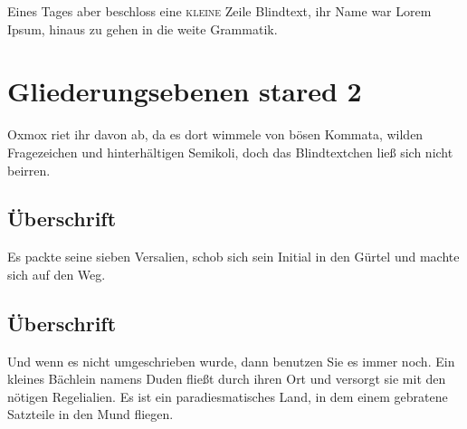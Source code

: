 \documentclass[%
	12pt,%
	a4paper,%
	oneside,%
 liststotoc, idxtotoc, bibtotoc, %
	halfparskip,%
	nochapterprefix,%
	appendixprefix, %
smallheadings,%
]{scrreprt}
\begin{document}
Eines Tages aber beschloss eine \textsc{kleine} Zeile Blindtext, ihr Name war Lorem Ipsum, hinaus zu gehen in die weite Grammatik.

\chapter*{Gliederungsebenen stared 2}
\label{sec:Gliederung4}

Oxmox riet ihr davon ab, da es dort wimmele von bösen Kommata, wilden Fragezeichen und hinterhältigen Semikoli, doch das Blindtextchen ließ sich nicht beirren. 

\section*{Überschrift}

Es packte seine sieben Versalien, schob sich sein Initial in den Gürtel und machte sich auf den Weg. 

%
%

\section*{Überschrift}
Und wenn es nicht umgeschrieben wurde, dann benutzen Sie es immer noch. Ein kleines Bächlein namens Duden fließt durch ihren Ort und versorgt sie mit den nötigen Regelialien. Es ist ein paradiesmatisches Land, in dem einem gebratene Satzteile in den Mund fliegen. 
\end{document}
